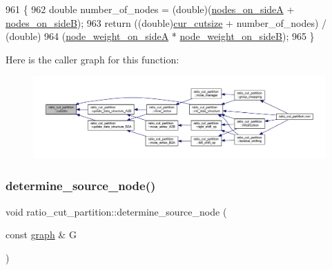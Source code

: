 \begin{DoxyCode}
961 \{
962     \textcolor{keywordtype}{double} number\_of\_nodes = (double)(\mbox{\hyperlink{classratio__cut__partition_a7de51193b63e241afe263345479580ee}{nodes\_on\_sideA}} + 
      \mbox{\hyperlink{classratio__cut__partition_a6b797912a7653537473e0e583a3f245a}{nodes\_on\_sideB}});
963     \textcolor{keywordflow}{return} ((\textcolor{keywordtype}{double})\mbox{\hyperlink{classratio__cut__partition_aa01f2d6257fff28739e2431fe826ef71}{cur\_cutsize}} + number\_of\_nodes) / (\textcolor{keywordtype}{double})
964     (\mbox{\hyperlink{classratio__cut__partition_af1b839e48e498cf8ca93c8ec5df8a686}{node\_weight\_on\_sideA}} * \mbox{\hyperlink{classratio__cut__partition_aa16d1b508db86eb0ba4824642394999a}{node\_weight\_on\_sideB}});
965 \}
\end{DoxyCode}
Here is the caller graph for this function\+:\nopagebreak
\begin{figure}[H]
\begin{center}
\leavevmode
\includegraphics[width=350pt]{classratio__cut__partition_a0adcba3c7847fcb62b607eebc334c503_icgraph}
\end{center}
\end{figure}
\mbox{\label{classratio__cut__partition_a7d3397f85318f781fbae287037e0ae33}} 
\subsubsection{\texorpdfstring{determine\+\_\+source\+\_\+node()}{determine\_source\_node()}}
{\footnotesize\ttfamily void ratio\+\_\+cut\+\_\+partition\+::determine\+\_\+source\+\_\+node (\begin{DoxyParamCaption}\item[{const \mbox{\hyperlink{classgraph}{graph}} \&}]{G }\end{DoxyParamCaption})\hspace{0.3cm}{\ttfamily [protected]}}



